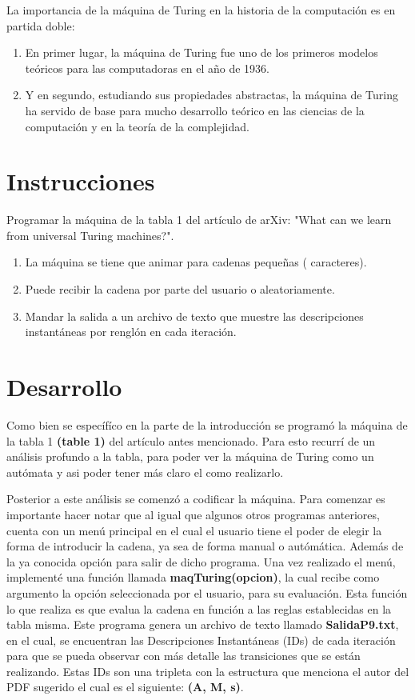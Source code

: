 \documentclass{article}
\begin{document}
	La importancia de la máquina de Turing en la historia de la computación es en partida doble:
	
	\begin{enumerate}
		\item En primer lugar, la máquina de Turing fue uno de los primeros modelos teóricos para las computadoras en el año de 1936.
		\item Y en segundo, estudiando sus propiedades abstractas, la máquina de Turing ha servido de base para mucho desarrollo teórico en las ciencias de la computación y en la teoría de la complejidad. 
	\end{enumerate}	

	
	
	
	
	
	\section*{Instrucciones}
	Programar la máquina de la tabla 1 del artículo de arXiv: "What can we learn from universal Turing machines?".
	\begin{enumerate}
		\item La máquina se tiene que animar para cadenas pequeñas ( caracteres). 
		
		\item Puede recibir la cadena por parte del usuario o aleatoriamente.
		\item Mandar la salida a un archivo de texto que muestre las descripciones instantáneas por renglón en cada iteración.
		
	\end{enumerate}
	\section*{Desarrollo}
	Como bien se específíco en la parte de la introducción se programó la máquina de la tabla 1 \textbf{(table 1)} del artículo antes mencionado. 
	Para esto recurrí de un análisis profundo a la tabla, para poder ver la máquina de Turing como un autómata y asi poder tener más claro el como realizarlo. 
	
	Posterior a este análisis se comenzó a codificar la máquina. Para comenzar es importante hacer notar que al igual que algunos otros programas anteriores, cuenta con un menú principal en el cual el usuario tiene el poder de elegir la forma de introducir la cadena, ya sea de forma manual o autómática. Además de la ya conocida opción para salir de dicho programa. Una vez realizado el menú, implementé una función llamada \textbf{maqTuring(opcion)}, la cual recibe como argumento la opción seleccionada por el usuario, para su evaluación. Esta función lo que realiza es que evalua la cadena en función a las reglas establecidas en la tabla misma. Este programa genera un archivo de texto llamado \textbf{SalidaP9.txt}, en el cual, se encuentran las Descripciones Instantáneas (IDs) de cada iteración para que se pueda observar con más detalle las transiciones que se están realizando. Estas IDs son una tripleta con la estructura que menciona el autor del PDF sugerido el cual es el siguiente: \textbf{(A, M, s)}.
	
\end{document}

